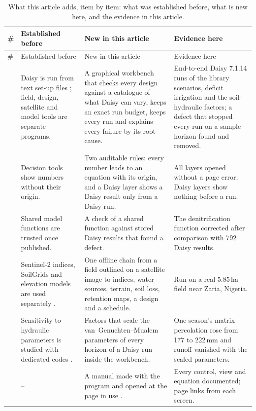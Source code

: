 {\small\setlength{\tabcolsep}{4pt}
\begin{longtable}{@{}>{\raggedright\arraybackslash}p{}>{\raggedright\arraybackslash}p{}>{\raggedright\arraybackslash}p{}>{\raggedright\arraybackslash}p{}@{}}
\caption{What this article adds, item by item: what was established before, what is new here, and the evidence in this article.}\label{tab:novelty}\\
\toprule
\# & Established before & New in this article & Evidence here\\\midrule\endfirsthead
\toprule \# & Established before & New in this article & Evidence here\\\midrule\endhead
1 & Daisy is run from text set-up files \citep{Hansen2012}; field, design, satellite and model tools are separate programs. & A graphical workbench that checks every design against a catalogue of what Daisy can vary, keeps an exact run budget, keeps every run and explains every failure by its root cause. & End-to-end Daisy 7.1.14 runs of the library scenarios, deficit irrigation and the soil-hydraulic factors; a defect that stopped every run on a sample horizon found and removed.\\
2 & Decision tools show numbers without their origin. & Two auditable rules: every number leads to an equation with its origin, and a Daisy layer shows a Daisy result only from a Daisy run. & All layers opened without a page error; Daisy layers show nothing before a run.\\
3 & Shared model functions are trusted once published. & A check of a shared function against stored Daisy results that found a defect. & The denitrification function corrected after comparison with 792 Daisy results.\\
4 & Sentinel-2 indices, SoilGrids and elevation models are used separately \citep{Drusch2012,Poggio2021}. & One offline chain from a field outlined on a satellite image to indices, water sources, terrain, soil loss, retention maps, a design and a schedule. & Run on a real 5.85\,ha field near Zaria, Nigeria.\\
5 & Sensitivity to hydraulic parameters is studied with dedicated codes \citep{Simunek2016}. & Factors that scale the van~Genuchten--Mualem parameters of every horizon of a Daisy run inside the workbench. & One season's matrix percolation rose from 177 to 222\,mm and runoff vanished with the scaled parameters.\\
6 & -- & A manual made with the program and opened at the page in use \citep{HaliluManual}. & Every control, view and equation documented; page links from each screen.\\
\bottomrule
\end{longtable}}
